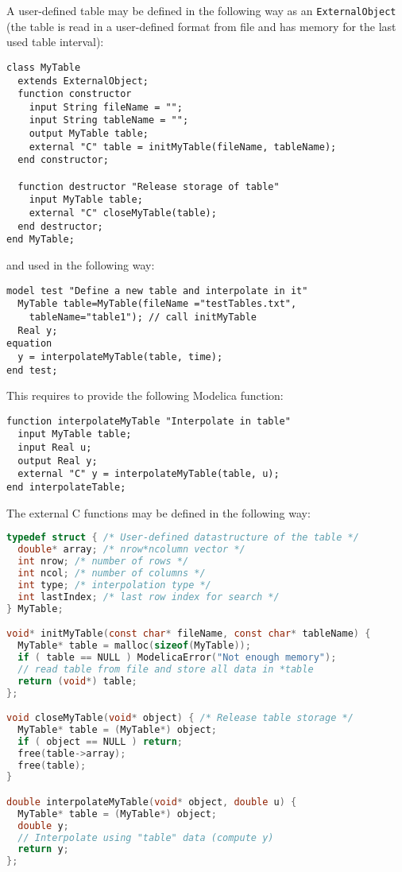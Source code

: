 \begin{example}
A user-defined table may be defined in the following way as an \lstinline!ExternalObject!
(the table is read in a user-defined format from file and has memory for the last used table interval):
\begin{lstlisting}[language=modelica]
class MyTable
  extends ExternalObject;
  function constructor
    input String fileName = "";
    input String tableName = "";
    output MyTable table;
    external "C" table = initMyTable(fileName, tableName);
  end constructor;

  function destructor "Release storage of table"
    input MyTable table;
    external "C" closeMyTable(table);
  end destructor;
end MyTable;
\end{lstlisting}
and used in the following way:
\begin{lstlisting}[language=modelica]
model test "Define a new table and interpolate in it"
  MyTable table=MyTable(fileName ="testTables.txt",
    tableName="table1"); // call initMyTable
  Real y;
equation
  y = interpolateMyTable(table, time);
end test;
\end{lstlisting}

This requires to provide the following Modelica function:
\begin{lstlisting}[language=modelica]
function interpolateMyTable "Interpolate in table"
  input MyTable table;
  input Real u;
  output Real y;
  external "C" y = interpolateMyTable(table, u);
end interpolateTable;
\end{lstlisting}
The external C functions may be defined in the following way:
\begin{lstlisting}[language=C]
typedef struct { /* User-defined datastructure of the table */
  double* array; /* nrow*ncolumn vector */
  int nrow; /* number of rows */
  int ncol; /* number of columns */
  int type; /* interpolation type */
  int lastIndex; /* last row index for search */
} MyTable;

void* initMyTable(const char* fileName, const char* tableName) {
  MyTable* table = malloc(sizeof(MyTable));
  if ( table == NULL ) ModelicaError("Not enough memory");
  // read table from file and store all data in *table
  return (void*) table;
};

void closeMyTable(void* object) { /* Release table storage */
  MyTable* table = (MyTable*) object;
  if ( object == NULL ) return;
  free(table->array);
  free(table);
}

double interpolateMyTable(void* object, double u) {
  MyTable* table = (MyTable*) object;
  double y;
  // Interpolate using "table" data (compute y)
  return y;
};
\end{lstlisting}
\end{example}
